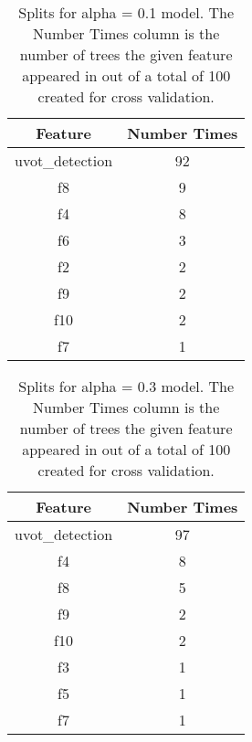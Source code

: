 \begin{table}[H]
\begin{center}
\begin{tabular}{cc}
  \hline
Feature & Number Times \\ 
  \hline
uvot\_detection & 92 \\ 
  f8 & 9 \\ 
  f4 & 8 \\ 
  f6 & 3 \\ 
  f2 & 2 \\ 
  f9 & 2 \\ 
  f10 & 2 \\ 
  f7 & 1 \\ 
   \hline
\end{tabular}
\caption{Splits for alpha = 0.1 model. The Number Times column is the number of trees the given feature appeared in out of a total of 100 created for cross validation.}
\end{center}
\end{table}
\begin{table}[H]
\begin{center}
\begin{tabular}{cc}
  \hline
Feature & Number Times \\ 
  \hline
uvot\_detection & 97 \\ 
  f4 & 8 \\ 
  f8 & 5 \\ 
  f9 & 2 \\ 
  f10 & 2 \\ 
  f3 & 1 \\ 
  f5 & 1 \\ 
  f7 & 1 \\ 
   \hline
\end{tabular}
\caption{Splits for alpha = 0.3 model. The Number Times column is the number of trees the given feature appeared in out of a total of 100 created for cross validation.}
\end{center}
\end{table}
